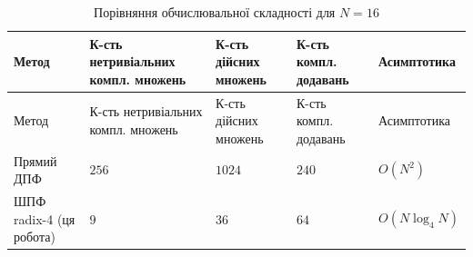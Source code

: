 \documentclass[
]{article}
\begin{document}
\begin{longtable}[]{@{}
  >{\raggedright\arraybackslash}p{}
  >{\centering\arraybackslash}p{}
  >{\centering\arraybackslash}p{}
  >{\centering\arraybackslash}p{}
  >{\centering\arraybackslash}p{}@{}}
\caption{Порівняння обчислювальної складності для
\(N = 16\)}\tabularnewline
\toprule\noalign{}
\begin{minipage}[b]{\linewidth}\raggedright
Метод
\end{minipage} & \begin{minipage}[b]{\linewidth}\centering
К-сть нетривіальних компл. множень
\end{minipage} & \begin{minipage}[b]{\linewidth}\centering
К-сть дійсних множень
\end{minipage} & \begin{minipage}[b]{\linewidth}\centering
К-сть компл. додавань
\end{minipage} & \begin{minipage}[b]{\linewidth}\centering
Асимптотика
\end{minipage} \\
\midrule\noalign{}
\endfirsthead
\toprule\noalign{}
\begin{minipage}[b]{\linewidth}\raggedright
Метод
\end{minipage} & \begin{minipage}[b]{\linewidth}\centering
К-сть нетривіальних компл. множень
\end{minipage} & \begin{minipage}[b]{\linewidth}\centering
К-сть дійсних множень
\end{minipage} & \begin{minipage}[b]{\linewidth}\centering
К-сть компл. додавань
\end{minipage} & \begin{minipage}[b]{\linewidth}\centering
Асимптотика
\end{minipage} \\
\midrule\noalign{}
\endhead
\bottomrule\noalign{}
\endlastfoot
Прямий ДПФ                 & \(256\) & \(1024\) & \(240\) & \(O(N^{2})\) \\
ШПФ radix-4 (ця робота)    & \(9\)   & \(36\)   & \(64\)  & \(O(N\log_{4}N)\) \\
\end{longtable}
\end{document}
